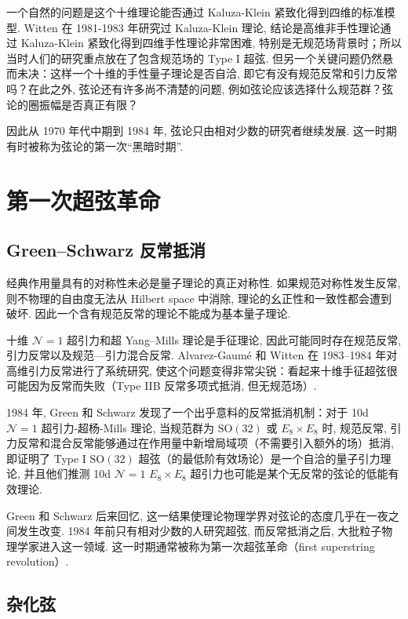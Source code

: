 \documentclass[10pt]{article}
\numberwithin{equation}{section}
\begin{document}
一个自然的问题是这个十维理论能否通过 Kaluza-Klein 紧致化得到四维的标准模型. Witten 在 1981-1983 年研究过 Kaluza-Klein 理论, 结论是高维非手性理论通过 Kaluza-Klein 紧致化得到四维手性理论非常困难, 特别是无规范场背景时\cite{Witten1981KK}；所以当时人们的研究重点放在了包含规范场的 Type I 超弦. 但另一个关键问题仍然悬而未决：这样一个十维的手性量子理论是否自洽, 即它有没有规范反常和引力反常吗？在此之外, 弦论还有许多尚不清楚的问题, 例如弦论应该选择什么规范群？弦论的圈振幅是否真正有限？

因此从 1970 年代中期到 1984 年, 弦论只由相对少数的研究者继续发展. 这一时期有时被称为弦论的第一次“黑暗时期”. 

\section{第一次超弦革命}

\subsection{Green–Schwarz 反常抵消}

经典作用量具有的对称性未必是量子理论的真正对称性. 如果规范对称性发生反常, 则不物理的自由度无法从 Hilbert space 中消除, 理论的幺正性和一致性都会遭到破坏. 因此一个含有规范反常的理论不能成为基本量子理论. 

十维 $\mathcal N=1$ 超引力和超 Yang–Mills 理论是手征理论, 因此可能同时存在规范反常, 引力反常以及规范—引力混合反常. Alvarez-Gaumé 和 Witten 在 1983–1984 年对高维引力反常进行了系统研究, 使这个问题变得非常尖锐：看起来十维手征超弦很可能因为反常而失败（Type IIB 反常多项式抵消, 但无规范场）\cite{AlvarezGaumeWitten1984}. 

1984 年, Green 和 Schwarz 发现了一个出乎意料的反常抵消机制：对于 10d $\mathcal{N}=1$ 超引力-超杨-Mills 理论, 当规范群为 $\mathrm{SO}(32)$ 或 $E_{8}\times E_{8}$ 时, 规范反常, 引力反常和混合反常能够通过在作用量中新增局域项（不需要引入额外的场）抵消, 即证明了 Type I $\mathrm{SO}(32)$ 超弦（的最低阶有效场论）是一个自洽的量子引力理论, 并且他们推测 10d $\mathcal{N}=1$ $E_{8}\times E_{8}$ 超引力也可能是某个无反常的弦论的低能有效理论\cite{GreenSchwarz1984}. 

Green 和 Schwarz 后来回忆, 这一结果使理论物理学界对弦论的态度几乎在一夜之间发生改变. 1984 年前只有相对少数的人研究超弦, 而反常抵消之后, 大批粒子物理学家进入这一领域. 这一时期通常被称为第一次超弦革命（first superstring revolution）. 

\subsection{杂化弦}
\end{document}
